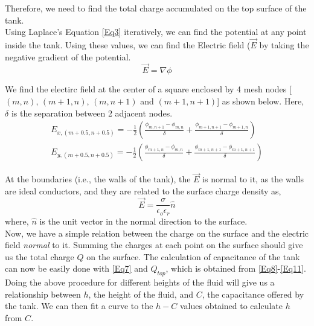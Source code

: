 \documentclass[11pt, a4paper, twoside]{report}
\begin{document}
        Therefore, we need to find the total charge accumulated on the top surface of the tank.\\

        Using Laplace's Equation \eqref{Eq3} iteratively, we can find the potential at any point inside the tank. Using these values, we can find the Electric field ($\vec{E}$ by taking the negative gradient of the potential.
            \begin{equation}
                \vec{E} = \nabla \phi
                \label{Eq8}
            \end{equation}

        We find the electirc field at the center of a square enclosed by 4 mesh nodes [$(m, n),\, (m+1, n),\, (m, n+1)$ and $(m+1, n+1)$] as shown below. Here, $\delta$ is the separation between 2 adjacent nodes.
            \begin{gather}
                E_{x,(m+0.5, n+0.5)} = -\frac{1}{2}\left(\frac{\phi_{m, n+1}-\phi_{m,n}}{\delta} + \frac{\phi_{m+1, n+1}-\phi_{m+1,n}}{\delta} \right)\\
                E_{y,(m+0.5, n+0.5)} = -\frac{1}{2}\left(\frac{\phi_{m+1, n}-\phi_{m,n}}{\delta} + \frac{\phi_{m+1, n+1}-\phi_{m+1,n+1}}{\delta} \right)
            \end{gather}

        At the boundaries (i.e., the walls of the tank), the $\vec{E}$ is normal to it, as the walls are ideal conductors, and they are related to the surface charge density as,
            \begin{equation}
                \vec{E} = \frac{\sigma}{\epsilon_o\epsilon_r}\hat{n}
                \label{Eq11}
            \end{equation}
        where, $\hat{n}$ is the unit vector in the normal direction to the surface.\\

        Now, we have a simple relation between the charge on the surface and the electric field \textit{normal} to it. Summing the charges at each point on the surface should give us the total charge $Q$ on the surface. The calculation of capacitance of the tank can now be easily done with \eqref{Eq7} and $Q_{top}$, which is obtained from \eqref{Eq8}-\eqref{Eq11}.\\

        Doing the above procedure for different heights of the fluid will give us a relationship between $h$, the height of the fluid, and $C$, the capacitance offered by the tank. We can then fit a curve to the $h-C$ values obtained to calculate $h$ from $C$.
\end{document}
